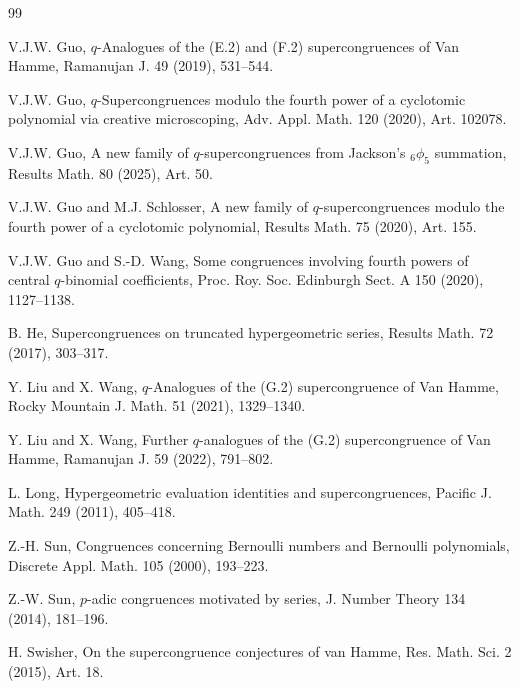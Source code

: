 \documentclass[12pt]{article}
\numberwithin{equation}{section}
\begin{document}
\begin{thebibliography}{99}
    \small \setlength{\itemsep}{-.8mm}
    
    

    

    

    V.J.W. Guo, $q$-Analogues of the (E.2) and (F.2) supercongruences of Van Hamme, 
    Ramanujan J. 49 (2019), 531--544.

    V.J.W. Guo, $q$-Supercongruences modulo the fourth power of a cyclotomic polynomial via creative microscoping, 
    Adv. Appl. Math. 120 (2020), Art. 102078.

    V.J.W. Guo, A new family of $q$-supercongruences from Jackson's $_6\phi_5$ summation, 
    Results Math. 80 (2025), Art. 50.





    V.J.W. Guo and M.J. Schlosser, A new family of $q$-supercongruences modulo the fourth power of a cyclotomic polynomial, 
    Results Math. 75 (2020), Art. 155.

    V.J.W. Guo and S.-D. Wang, Some congruences involving fourth powers of central $q$-binomial coefficients, 
    Proc. Roy. Soc. Edinburgh Sect. A 150 (2020), 1127--1138.

    B. He, Supercongruences on truncated hypergeometric series, 
    Results Math. 72 (2017), 303--317.

    Y. Liu and X. Wang, $q$-Analogues of the (G.2) supercongruence of Van Hamme, 
    Rocky Mountain J. Math. 51 (2021), 1329--1340.

    Y. Liu and X. Wang, Further $q$-analogues of the (G.2) supercongruence of Van Hamme, 
    Ramanujan J. 59 (2022), 791--802.

    L. Long, Hypergeometric evaluation identities and supercongruences, 
    Pacific J. Math. 249 (2011), 405--418.



    Z.-H. Sun, Congruences concerning Bernoulli numbers and Bernoulli polynomials, 
    Discrete Appl. Math. 105 (2000), 193--223.

    Z.-W. Sun, $p$-adic congruences motivated by series, 
    J. Number Theory 134 (2014), 181--196.

     H. Swisher, On the supercongruence conjectures of van Hamme, 
    Res. Math. Sci. 2 (2015), Art. 18.


\end{thebibliography}
\end{document}
